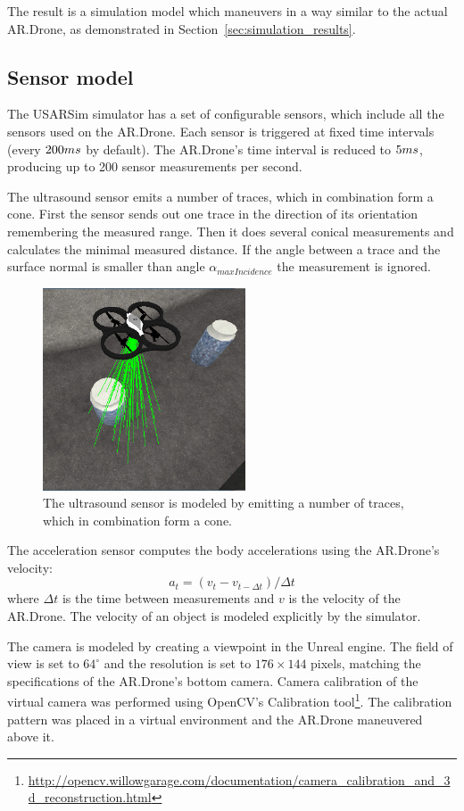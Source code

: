The result is a simulation model which maneuvers in a way similar to the actual AR.Drone, as demonstrated in Section~\ref{sec:simulation_results}.


		\subsection{Sensor model}
The USARSim simulator has a set of configurable sensors, which include all the sensors used on the AR.Drone.
Each sensor is triggered at fixed time intervals (every $200\small{ms}$ by default).
The AR.Drone's time interval is reduced to $5\small{ms}$, producing up to 200 sensor measurements per second.

The ultrasound sensor emits a number of traces, which in combination form a cone.
First the sensor sends out one trace in the direction of its orientation remembering the measured range.
Then it does several conical measurements and calculates the minimal measured distance.
If the angle between a trace and the surface normal is smaller than angle $\alpha_{maxIncidence}$ the measurement is ignored.

\begin{figure}[htb!]
\centering
\includegraphics[width=6cm]{images/usarsim_sonar_beams.png}
\caption{The ultrasound sensor is modeled by emitting a number of traces, which in combination form a cone.} 
\label{fig:3Dmodel}
\end{figure}


The acceleration sensor computes the body accelerations using the AR.Drone's velocity:
\begin{equation}
a_{t} = (v_{t} - v_{t-\Delta t}) / \Delta t
\end{equation}
where $\Delta t$ is the time between measurements and $v$ is the velocity of the AR.Drone. The velocity of an object is modeled explicitly by the simulator.

The camera is modeled by creating a viewpoint in the Unreal engine.
The field of view is set to $64^\circ$ and the resolution is set to $176 \times 144$ pixels, matching the specifications of the AR.Drone's bottom camera.
Camera calibration of the virtual camera was performed using OpenCV's Calibration tool\footnote{\url{http://opencv.willowgarage.com/documentation/camera_calibration_and_3d_reconstruction.html}}.
The calibration pattern was placed in a virtual environment and the AR.Drone maneuvered above it.


